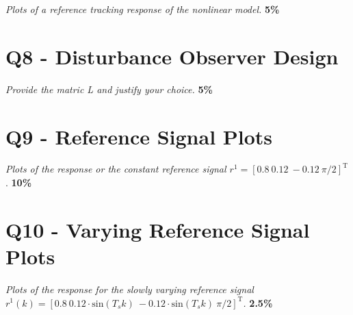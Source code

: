 \documentclass[12pt]{article}
\begin{document}
\begin{center}
    \textit{Plots of a reference tracking response of the nonlinear model.} \textbf{5\%}
\end{center}
 
\section{Q8 - Disturbance Observer Design}

\begin{center}
    \textit{Provide the matric L and justify your choice.} \textbf{5\%}
\end{center}
 
\section{Q9 - Reference Signal Plots}

\begin{center}
    \textit{Plots of the response or the constant reference signal $r^1 = \left[0.8 \ 0.12 \
    -0.12 \ \pi/2 \right]^\mathrm{T}$}. \textbf{10\%}
\end{center}
 
\section{Q10 - Varying Reference Signal Plots}

\begin{center}
    \textit{Plots of the response for the slowly varying reference signal $r^1(k) = \left[0.8 \
    0.12 \cdot \mathrm{sin}(T_s k) \ -0.12 \cdot \mathrm{sin}(T_s k) \ \pi/2 \right]^\mathrm{T}$.} \textbf{2.5\%}
\end{center}
\end{document}
